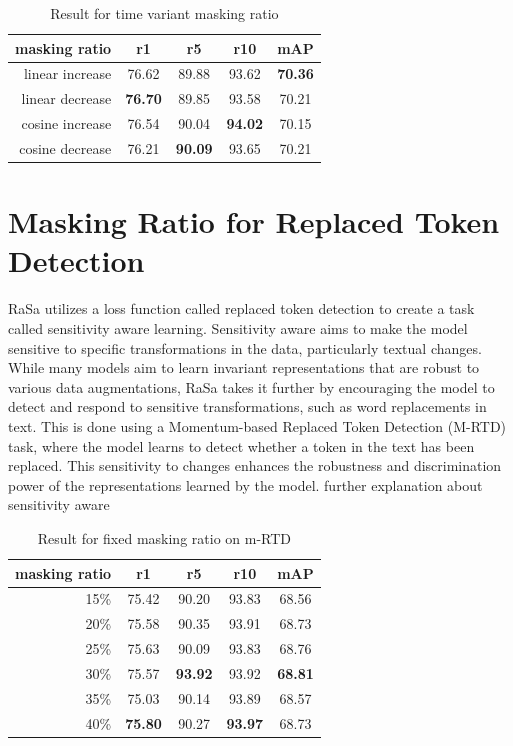 \begin{table}[htbp]
  \centering
  \caption{Result for time variant masking ratio}
  \begin{tabular}{rcccc}
    \centering
    masking ratio & r1 & r5 & r10 & mAP\\ \hline
    linear increase & 76.62 & 89.88 & 93.62 & \textbf{70.36} \\
    linear decrease & \textbf{76.70} & 89.85 & 93.58 & 70.21 \\
    cosine increase & 76.54 & 90.04 & \textbf{94.02} & 70.15 \\
    cosine decrease & 76.21 & \textbf{90.09} & 93.65 & 70.21 \\
  \end{tabular}
\end{table}

\section{Masking Ratio for Replaced Token Detection}
RaSa utilizes a loss function called replaced token detection to create a task called sensitivity aware learning.
Sensitivity aware aims to make the model sensitive to specific transformations in the data, particularly textual changes. While many models aim to learn invariant representations that are robust to various data augmentations, RaSa takes it further by encouraging the model to detect and respond to sensitive transformations, such as word replacements in text. This is done using a Momentum-based Replaced Token Detection (M-RTD) task, where the model learns to detect whether a token in the text has been replaced. This sensitivity to changes enhances the robustness and discrimination power of the representations learned by the model.
{\color{red}further explanation about sensitivity aware}


\begin{table}[htbp]
  \centering
  \caption{Result for fixed masking ratio on m-RTD}
  \begin{tabular}{rcccc}
    masking ratio & r1 & r5 & r10 & mAP \\ \hline
    15\% & 75.42 & 90.20 & 93.83 & 68.56 \\
    20\% & 75.58 & 90.35 & 93.91 & 68.73 \\
    25\% & 75.63 & 90.09 & 93.83 & 68.76 \\
    30\% & 75.57 & \textbf{93.92} & 93.92 & \textbf{68.81} \\
    35\% & 75.03 & 90.14 & 93.89 & 68.57 \\
    40\% & \textbf{75.80} & 90.27 & \textbf{93.97} & 68.73
  \end{tabular}
\end{table}

